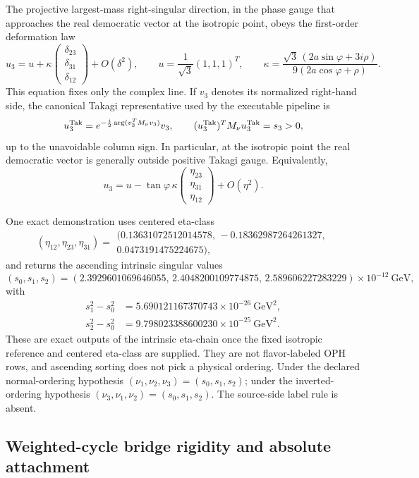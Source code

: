 \documentclass[11pt]{article}
\begin{document}
The projective largest-mass right-singular direction, in the phase gauge that
approaches the real democratic vector at the isotropic point, obeys the
first-order deformation law
\[
u_3=
u+
\kappa
\begin{pmatrix}
\delta_{23}\\
\delta_{31}\\
\delta_{12}
\end{pmatrix}
+O(\delta^2),
\qquad
u=\frac1{\sqrt3}(1,1,1)^T,
\qquad
\kappa=
\frac{\sqrt3\,(2a\sin\varphi+3i\rho)}
 {9(2a\cos\varphi+\rho)}.
\]
This equation fixes only the complex line.  If \(v_3\) denotes its normalized
right-hand side, the canonical Takagi representative used by the executable
pipeline is
\[
u_3^{\rm Tak}=e^{-\frac{i}{2}\arg(v_3^T M_\nu v_3)}v_3,
\qquad
(u_3^{\rm Tak})^T M_\nu u_3^{\rm Tak}=s_3>0,
\]
up to the unavoidable column sign.  In particular, at the isotropic point the
real democratic vector is generally outside positive Takagi gauge.
Equivalently,
\[
u_3=
u-
\tan\varphi\,\kappa
\begin{pmatrix}
\eta_{23}\\
\eta_{31}\\
\eta_{12}
\end{pmatrix}
+O(\eta^2).
\]

One exact demonstration uses centered eta-class
\[
(\eta_{12},\eta_{23},\eta_{31})
=
\begin{gathered}
(0.13631072512014578,\,-0.18362987264261327,\\
0.0473191475224675),
\end{gathered}
\]
and returns the ascending intrinsic singular values
\[
(s_0,s_1,s_2)=
(2.3929601069646055,\,
2.4048200109774875,\,
2.589606227283229)\times10^{-12}\ \mathrm{GeV},
\]
with
\[
\begin{aligned}
s_1^2-s_0^2
&=5.690121167370743\times10^{-26}\ \mathrm{GeV}^2,\\
s_2^2-s_0^2
&=9.798023388600230\times10^{-25}\ \mathrm{GeV}^2.
\end{aligned}
\]
These are exact outputs of the intrinsic eta-chain once the fixed isotropic reference and centered
eta-class are supplied. They are not flavor-labeled OPH rows, and ascending sorting does not pick
a physical ordering. Under the declared normal-ordering hypothesis
\((\nu_1,\nu_2,\nu_3)=(s_0,s_1,s_2)\); under the inverted-ordering hypothesis
\((\nu_3,\nu_1,\nu_2)=(s_0,s_1,s_2)\). The source-side label rule is absent.

\subsection{Weighted-cycle bridge rigidity and absolute attachment}
\end{document}
